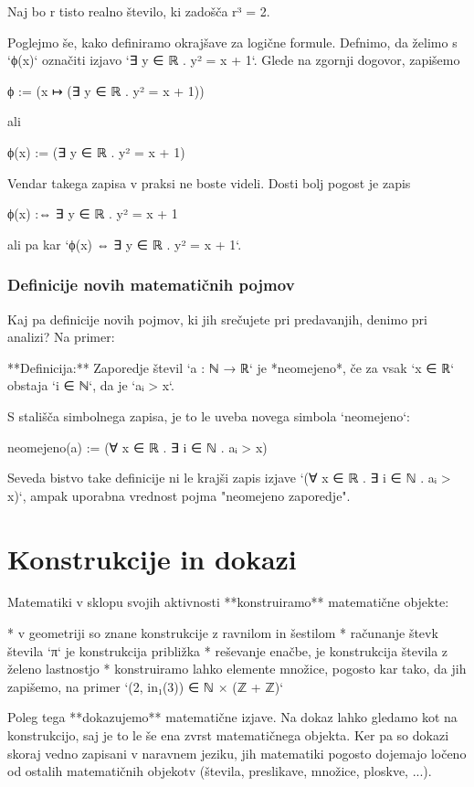     Naj bo r tisto realno število, ki zadošča r³ = 2.

Poglejmo še, kako definiramo okrajšave za logične formule. Defnimo, da želimo s `ϕ(x)` označiti izjavo `∃ y ∈ ℝ . y² =
x + 1`. Glede na zgornji dogovor, zapišemo

    ϕ := (x ↦ (∃ y ∈ ℝ . y² = x + 1))

ali

    ϕ(x) := (∃ y ∈ ℝ . y² = x + 1)

Vendar takega zapisa v praksi ne boste videli. Dosti bolj pogost je zapis

    ϕ(x) :⇔ ∃ y ∈ ℝ . y² = x + 1

ali pa kar `ϕ(x) ⇔ ∃ y ∈ ℝ . y² = x + 1`.


\subsection{Definicije novih matematičnih pojmov}

Kaj pa definicije novih pojmov, ki jih srečujete pri predavanjih, denimo pri analizi? Na primer:

**Definicija:** Zaporedje števil `a : ℕ → ℝ` je *neomejeno*, če za vsak `x ∈ ℝ` obstaja `i ∈ ℕ`, da je `aᵢ > x`.

S stališča simbolnega zapisa, je to le uveba novega simbola `neomejeno`:

    neomejeno(a) := (∀ x ∈ ℝ . ∃ i ∈ ℕ . aᵢ > x)

Seveda bistvo take definicije ni le krajši zapis izjave `(∀ x ∈ ℝ . ∃ i ∈ ℕ . aᵢ > x)`, ampak uporabna vrednost pojma
"neomejeno zaporedje".


\chapter{Konstrukcije in dokazi}

Matematiki v sklopu svojih aktivnosti **konstruiramo** matematične objekte:

* v geometriji so znane konstrukcije z ravnilom in šestilom
* računanje števk števila `π` je konstrukcija približka
* reševanje enačbe, je konstrukcija števila z želeno lastnostjo
* konstruiramo lahko elemente množice, pogosto kar tako, da jih zapišemo, na primer `(2, in₁(3)) ∈ ℕ × (ℤ + ℤ)`

Poleg tega **dokazujemo** matematične izjave. Na dokaz lahko gledamo kot na konstrukcijo, saj je to le še ena zvrst
matematičnega objekta. Ker pa so dokazi skoraj vedno zapisani v naravnem jeziku, jih matematiki pogosto dojemajo ločeno
od ostalih matematičnih objekotv (števila, preslikave, množice, ploskve, ...).

